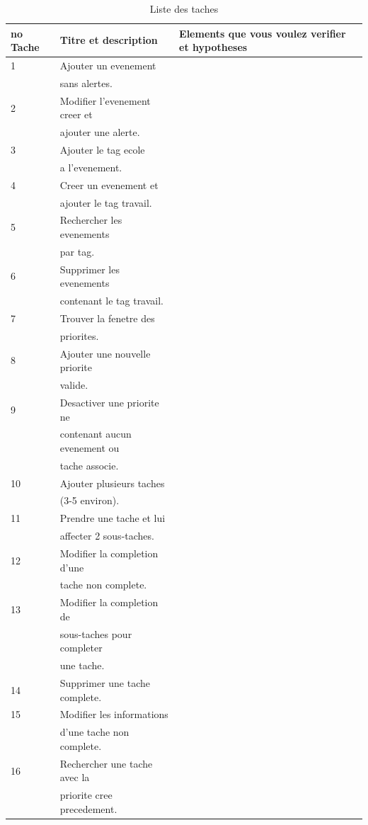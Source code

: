 \documentclass[letterpaper, oneside, 12pt, these, creativecommons]{thETS}
\begin{document}
\begin{table}
	\centering
	\begin{tabular}{|l|l|l|}
		\hline
		no Tache	& Titre et description		& Elements que vous voulez verifier et hypotheses 	\\ \hline 
		1		& Ajouter un evenement		&  							\\ 
				& sans alertes.			&							\\ \hline
		2		& Modifier l'evenement creer et	&							\\
				& ajouter une alerte.		&							\\ \hline
		3		& Ajouter le tag ecole		&							\\
				& a l'evenement.			&							\\ \hline
		4		& Creer un evenement et		&							\\
				& ajouter le tag travail.		&							\\ \hline
		5		& Rechercher les evenements	& 							\\
				& par tag.				&							\\ \hline
		6		& Supprimer les evenements	&							\\
				& contenant le tag travail.		&							\\ \hline
		7		& Trouver la fenetre des		&							\\
				& priorites.				& 							\\ \hline
		8		& Ajouter une nouvelle priorite 	&							\\
				& valide.				&							\\ \hline
		9		& Desactiver une priorite ne	&							\\
				& contenant aucun evenement ou &							\\
				& tache associe.			&							\\ \hline
		10		& Ajouter plusieurs taches		&							\\
				& (3-5 environ).			&							\\ \hline
		11		& Prendre une tache et lui		&							\\
				& affecter 2 sous-taches.		&							\\ \hline
		12		& Modifier la completion d'une	&							\\
				& tache non complete.		&							\\ \hline
		13		& Modifier la completion de	&							\\
				& sous-taches pour completer	&							\\ 
				& une tache.				&							\\ \hline
		14		& Supprimer une tache complete.	&							\\ \hline
		15		& Modifier les informations		&							\\
				& d'une tache non complete.	&							\\ \hline
		16		& Rechercher une tache avec la 	&							\\
				& priorite cree precedement.	& 							\\ \hline
	\end{tabular}
	\caption{Liste des taches}
\end{table}
\end{document}
